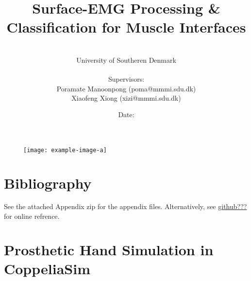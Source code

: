 \documentclass[a4paper, 12pt]{article}
\title{\textbf{Surface-EMG Processing \& Classification for Muscle Interfaces}}
\author{
\\University of Southeren Denmark
\\
\\Supervisors: 
\\Poramate Manoonpong (poma@mmmi.sdu.dk)
\\Xiaofeng Xiong (xizi@mmmi.sdu.dk)
}
\date{Date: }
\begin{document}
\maketitle
\begin{figure}[h]
\begin{center}
\texttt{[image: example-image-a]}
\end{center}
\end{figure}
\newpage


\newpage


\newpage


\newpage

\tableofcontents
\newpage


\newpage

\newpage

\newpage

\newpage

\newpage

\newpage

\newpage

\section{Bibliography}
\listoffigures
\listoftables

\printbibliography

\newpage
\listofappendices  %
\appendix %


See the attached Appendix zip for the appendix files. 
Alternatively, see \url{github???} for online refrence.

\section{Prosthetic Hand Simulation in CoppeliaSim}
\label{appendix:handsim}
\end{document}
